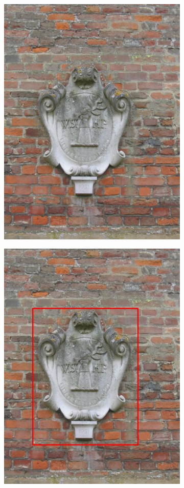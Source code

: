 \documentclass[a4paper,11]{article}
\begin{document}
\begin{center}
\begin{figure}[H]
   \begin{subfigure}{0.33\textwidth}
      \centering
      \includegraphics[width=0.9\linewidth]{images/memorial}
    \end{subfigure}
    \begin{subfigure}{.33\textwidth}
      \centering
      \includegraphics[width=0.9\linewidth]{results/input/memorial}

\end{subfigure}
\end{figure}
\end{center}
\end{document}
